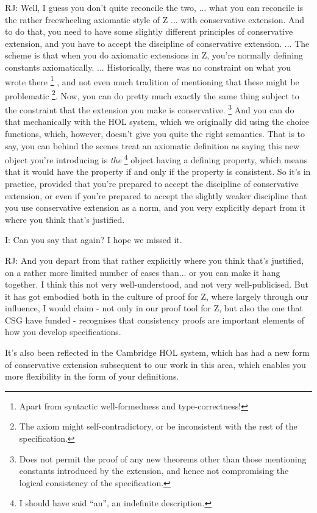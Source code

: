 \documentclass[10pt,titlepage]{book}
\begin{document}
RJ: Well, I guess you don't quite reconcile the two, ... what you can reconcile is the rather freewheeling axiomatic style of Z ... with conservative extension.
And to do that, you need to have some slightly different principles of conservative extension, and you have to accept the discipline of conservative extension.
...
The scheme is that when you do axiomatic extensions in Z, you're normally defining constants axiomatically.
...
Historically, there was no constraint on what you wrote there%
\footnote{
Apart from syntactic well-formedness and type-correctness!}%
, and not even much tradition of mentioning that these might be problematic%
\footnote{
The axiom might self-contradictory, or be inconsistent with the rest of the specification.
}.
Now, you can do pretty much exactly the same thing subject to the constraint that the extension you make is conservative.%
\footnote{
Does not permit the proof of any new theorems other than those mentioning constants introduced by the extension, and hence not compromising the logical consistency of the specification.}
And you can do that mechanically with the HOL system, which we originally did using the choice functions, which, however, doesn't give you quite the right semantics.
That is to say, you can behind the scenes treat an axiomatic definition as saying this new object you're introducing is {\it the}%
\footnote{I should have said ``an'', an indefinite description.}%
 object having a defining property, which means that it would have the property if and only if the property is consistent.
So it's in practice, provided that you're prepared to accept the discipline of conservative extension, or even if you're prepared to accept the slightly weaker discipline that you use conservative extension as a norm, and you very explicitly depart from it where you think that's justified.

I: Can you say that again? I hope we missed it.

RJ: And you depart from that rather explicitly where you think that's justified, on a rather more limited number of cases than... or you can make it hang together.
I think this not very well-understood, and not very well-publicised.
But it has got embodied both in the culture of proof for Z, where largely through our influence, I would claim - not only in our proof tool for Z, but also the one that CSG have funded - recognises that consistency proofs are important elements of how you develop specifications.

It's also been reflected in the Cambridge HOL system, which has had a new form of conservative extension subsequent to our work in this area, which enables you more flexibility in the form of your definitions.
\end{document}

